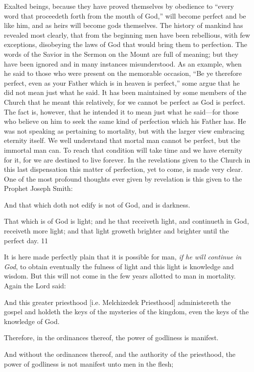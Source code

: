 Exalted beings, because they have proved themselves by obedience to ``every word that
proceedeth forth from the mouth of God,'' will become perfect and be like him, and as heirs
will become gods themselves. The history of mankind has revealed most clearly, that from
the beginning men have been rebellious, with few exceptions, disobeying the laws of God
that would bring them to perfection. The words of the Savior in the Sermon on the Mount are
full of meaning; but they have been ignored and in many instances misunderstood. As an
example, when he said to those who were present on the memorable occasion, ``Be ye
therefore perfect, even as your Father which is in heaven is perfect,'' some argue that he did
not mean just what he said. It has been maintained by some members of the Church that he
meant this relatively, for we cannot be perfect as God is perfect. The fact is, however, that he
intended it to mean just what he said—for those who believe on him to seek the same kind of
perfection which his Father has. He was not speaking as pertaining to mortality, but with the
larger view embracing eternity itself. We well understand that mortal man cannot be perfect,
but the immortal man can. To reach that condition will take time and we have eternity for it,
for we are destined to live forever. In the revelations given to the Church in this last
dispensation this matter of perfection, yet to come, is made very clear. One of the most
profound thoughts ever given by revelation is this given to the Prophet Joseph Smith:

And that which doth not edify is not of God, and is darkness.

That which is of God is light; and he that receiveth light, and continueth in God, receiveth
more light; and that light groweth brighter and brighter until the perfect day. 11

It is here made perfectly plain that it is possible for man, \textit{if he will continue in God}, to obtain
eventually the fulness of light and this light is knowledge and wisdom. But this will not come
in the few years allotted to man in mortality. Again the Lord said:

And this greater priesthood [i.e. Melchizedek Priesthood] administereth the gospel and
holdeth the keys of the mysteries of the kingdom, even the keys of the knowledge of God.

Therefore, in the ordinances thereof, the power of godliness is manifest.

And without the ordinances thereof, and the authority of the priesthood, the power of
godliness is not manifest unto men in the flesh;

